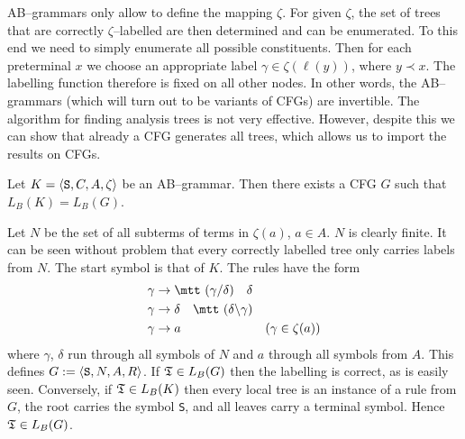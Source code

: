 AB--grammars only allow to define the mapping
$\zeta$. For given $\zeta$, the set of trees that are correctly
$\zeta$--labelled are then determined and can be enumerated. To 
this end we need to simply enumerate all possible constituents. 
Then for each preterminal $x$ we choose an appropriate label $\gamma 
\in \zeta(\ell(y))$, where $y \prec x$. The labelling function
therefore is fixed on all other nodes. In other words, the 
AB--grammars (which will turn out to be variants of CFGs) 
are invertible. The algorithm for finding analysis trees is not very 
effective. However, despite this we can show that already a CFG generates 
all trees, which allows us to import the results on CFGs.
\begin{thm}
Let $K = \langle \mbox{\tt S}, C, A, \zeta\rangle$ be an AB--grammar. 
Then there exists a CFG $G$ such that $L_B(K) = L_B(G)$.
\end{thm}
\proofbeg
Let $N$ be the set of all subterms of terms in $\zeta(a)$,
$a \in A$. $N$ is clearly finite. It can be seen without problem 
that every correctly labelled tree only carries labels from $N$. 
The start symbol is that of $K$. The rules have the form
\begin{align}
\gamma & \pf \mbox{\mtt ($\gamma${\tf}$\delta$)} \quad \delta & \\
\gamma & \pf \delta \quad \mbox{\mtt ($\delta${\tb}$\gamma$)} & \\
\gamma & \pf a           & (\gamma \in \zeta(a))
\end{align}
where $\gamma$, $\delta$ run through all symbols of $N$ and $a$ 
through all symbols from $A$. This defines $G := \auf \mbox{\tt S}, %
N, A, R\zu$. If $\mathfrak{T} \in L_B(G)$ then the labelling is correct, as 
is easily seen. Conversely, if $\mathfrak{T} \in L_B(K)$ then every local tree 
is an instance of a rule from $G$, the root carries the symbol
{\tt S}, and all leaves carry a terminal symbol. Hence $\mathfrak{T} \in L_B(G)$.
\proofend

